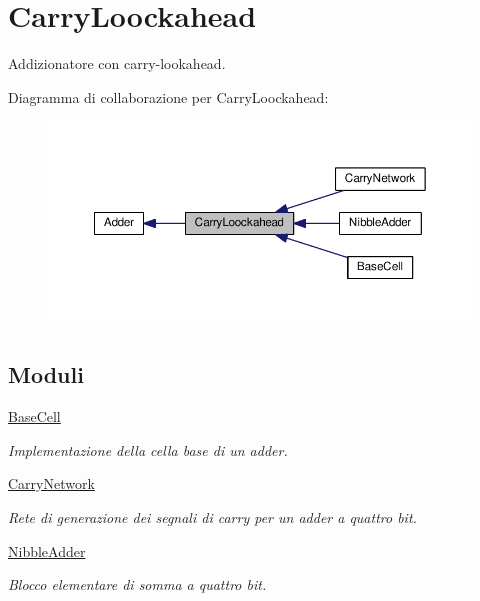 \hypertarget{group___carry_loockahead}{\section{Carry\+Loockahead}
\label{group___carry_loockahead}
}


Addizionatore con carry-\/lookahead.  


Diagramma di collaborazione per Carry\+Loockahead\+:\nopagebreak
\begin{figure}[H]
\begin{center}
\leavevmode
\includegraphics[width=350pt]{group___carry_loockahead}
\end{center}
\end{figure}
\subsection*{Moduli}
\begin{DoxyCompactItemize}
\item 
\hyperlink{group___base_cell}{Base\+Cell}
\begin{DoxyCompactList}\small\item\em Implementazione della cella base di un adder. \end{DoxyCompactList}\item 
\hyperlink{group___carry_network}{Carry\+Network}
\begin{DoxyCompactList}\small\item\em Rete di generazione dei segnali di carry per un adder a quattro bit. \end{DoxyCompactList}\item 
\hyperlink{group___nibble_adder}{Nibble\+Adder}
\begin{DoxyCompactList}\small\item\em Blocco elementare di somma a quattro bit. \end{DoxyCompactList}\end{DoxyCompactItemize}
